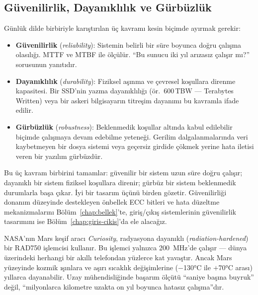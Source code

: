 \subsection{Güvenilirlik, Dayanıklılık ve Gürbüzlük}
\label{subsec:guvenilirlik-dayaniklilik-gurbuzluk}

Günlük dilde birbiriyle karıştırılan üç kavramı kesin biçimde ayırmak gerekir:
\begin{itemize}
    \item \textbf{Güvenilirlik} (\emph{reliability}): Sistemin belirli bir süre boyunca doğru çalışma olasılığı. MTTF ve MTBF ile ölçülür. ``Bu sunucu iki yıl arızasız çalışır mı?'' sorusunun yanıtıdır.
    \item \textbf{Dayanıklılık} (\emph{durability}): Fiziksel aşınma ve çevresel koşullara direnme kapasitesi. Bir SSD'nin yazma dayanıklılığı (ör.\ 600\,TBW --- Terabytes Written) veya bir askeri bilgisayarın titreşim dayanımı bu kavramla ifade edilir.
    \item \textbf{Gürbüzlük} (\emph{robustness}): Beklenmedik koşullar altında kabul edilebilir biçimde çalışmaya devam edebilme yeteneği. Gerilim dalgalanmalarında veri kaybetmeyen bir dosya sistemi veya geçersiz girdide çökmek yerine hata iletisi veren bir yazılım gürbüzdür.
\end{itemize}

Bu üç kavram birbirini tamamlar: güvenilir bir sistem uzun süre doğru çalışır; dayanıklı bir sistem fiziksel koşullara direnir; gürbüz bir sistem beklenmedik durumlarla başa çıkar. İyi bir tasarım üçünü birden gözetir. Güvenilirliği donanım düzeyinde destekleyen önbellek ECC bitleri ve hata düzeltme mekanizmalarını Bölüm~\ref{chap:bellek}'te, giriş/çıkış sistemlerinin güvenilirlik tasarımını ise Bölüm~\ref{chap:giris-cikis}'da ele alacağız.

\begin{bilginot}
NASA'nın Mars keşif aracı \emph{Curiosity}, radyasyona dayanıklı (\emph{radiation-hardened}) bir RAD750 işlemcisi kullanır. Bu işlemci yalnızca 200~MHz'de çalışır --- dünya üzerindeki herhangi bir akıllı telefondan yüzlerce kat yavaştır. Ancak Mars yüzeyinde kozmik ışınlara ve aşırı sıcaklık değişimlerine ($-$130°C ile $+$70°C arası) yıllarca dayanabilir. Uzay mühendisliğinde başarım ölçütü ``saniye başına buyruk'' değil, ``milyonlarca kilometre uzakta on yıl boyunca hatasız çalışma''dır.
\end{bilginot}


